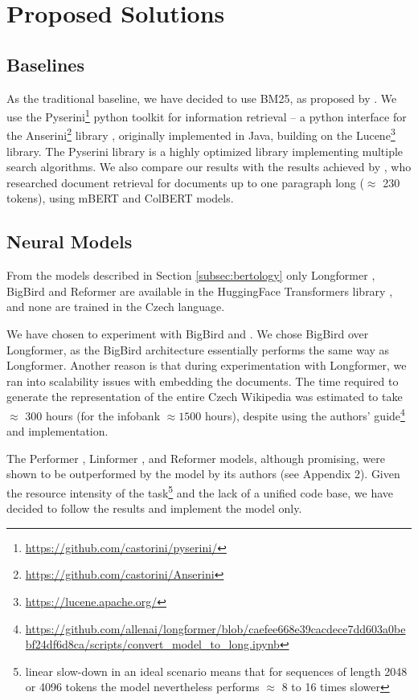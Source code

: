 \chapter{Proposed Solutions}

\section{Baselines}

As the traditional baseline, we have decided to use BM25, as proposed by \citet{weak-baselines}.
We use the Pyserini\footnote{\url{https://github.com/castorini/pyserini/}} python toolkit for information retrieval \citep{pyserini} -- a python interface for the Anserini\footnote{\url{https://github.com/castorini/Anserini}} library \citep{anserini1, anserini2}, originally implemented in Java, building on the Lucene\footnote{\url{https://lucene.apache.org/}} library.
The Pyserini library is a highly optimized library implementing multiple search algorithms.
We also compare our results with the results achieved by \citet{rypar}, who researched document retrieval for documents up to one paragraph long ($\approx$ 230 tokens), using mBERT and ColBERT \citep{colbert} models.

\section{Neural Models}

From the models described in Section \ref{subsec:bertology} only Longformer \citep{longformer}, BigBird \citep{bigbird} and Reformer \citep{reformer} are available in the HuggingFace Transformers library \citep{huggingface}, and none are trained in the Czech language. 

We have chosen to experiment with BigBird and \nystr{}. 
We chose BigBird over Longformer, as the BigBird architecture essentially performs the same way as Longformer. Another reason is that during experimentation with Longformer, we ran into scalability issues with embedding the documents.
The time required to generate the representation of the entire Czech Wikipedia was estimated to take $\approx$ 300 hours (for the \CTK{} infobank $\approx 1500$ hours), despite using the authors' guide\footnote{\url{https://github.com/allenai/longformer/blob/caefee668e39cacdece7dd603a0bebf24df6d8ca/scripts/convert_model_to_long.ipynb}} and implementation.

The Performer \citep{performer}, Linformer \citep{linformer}, and Reformer \citep{reformer} models, although promising, were shown to be outperformed by the \nystr{} model by its authors (see Appendix 2).
Given the resource intensity of the task\footnote{linear slow-down in an ideal scenario means that for sequences of length 2048 or 4096 tokens the model nevertheless performs $\approx$ 8 to 16 times slower} and the lack of a unified code base, we have decided to follow the results and implement the \nystr{} model only.

